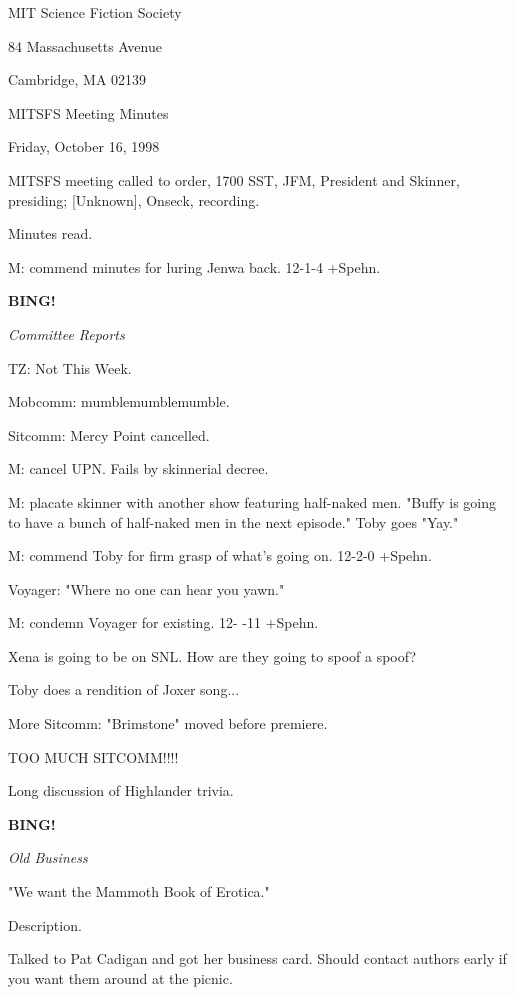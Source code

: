 \documentclass[12pt]{article}
\newcommand{\bing}{{\bf BING!} }
\newcommand{\goto}[1]{\bing \vskip 12pt \centerline{{\em{#1}}}}
\begin{document}
\begin{center}

MIT Science Fiction Society 

84 Massachusetts Avenue

Cambridge, MA 02139

\vspace{12pt}

MITSFS Meeting Minutes 

Friday, October 16, 1998

\end{center}
 
\vspace{18pt}

\setlength{\parskip}{6pt}

\noindent
MITSFS meeting called to order, 1700 SST,
JFM, President and Skinner, presiding; [Unknown], Onseck, recording.

Minutes read.

M: commend minutes for luring Jenwa back. 12-1-4 +Spehn.

\goto{Committee Reports}

TZ: Not This Week.

Mobcomm: mumblemumblemumble.

Sitcomm: Mercy Point cancelled.

M: cancel UPN. Fails by skinnerial decree.

M: placate skinner with another show featuring half-naked men. "Buffy is going to have a bunch of half-naked men in the next episode." Toby goes "Yay."

M: commend Toby for firm grasp of what's going on. 12-2-0 +Spehn.

Voyager: "Where no one can hear you yawn."

M: condemn Voyager for existing. 12- -11 +Spehn.

Xena is going to be on SNL. How are they going to spoof a spoof?

Toby does a rendition of Joxer song...

More Sitcomm: "Brimstone" moved before premiere.

TOO MUCH SITCOMM!!!!

Long discussion of Highlander trivia.

\goto{Old Business}

"We want the Mammoth Book of Erotica."

Description.

Talked to Pat Cadigan and got her business card. Should contact authors early if you want them around at the picnic.
\end{document}
